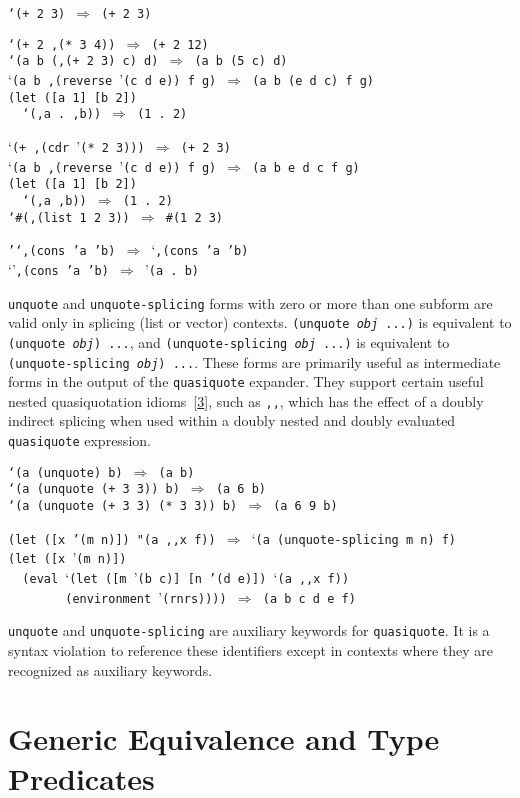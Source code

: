 \begin{alltt}
`(+ 2 3) \(\Rightarrow\) (+ 2 3)

`(+ 2 ,(* 3 4)) \(\Rightarrow\) (+ 2 12)
`(a b (,(+ 2 3) c) d) \(\Rightarrow\) (a b (5 c) d)
`(a b ,(reverse '(c d e)) f g) \(\Rightarrow\) (a b (e d c) f g)
(let ([a 1] [b 2])
  `(,a . ,b)) \(\Rightarrow\) (1 . 2)

`(+ ,\@{}(cdr '(* 2 3))) \(\Rightarrow\) (+ 2 3)
`(a b ,\@{}(reverse '(c d e)) f g) \(\Rightarrow\) (a b e d c f g)
(let ([a 1] [b 2])
  `(,a ,\@{}b)) \(\Rightarrow\) (1 . 2)
`\#{}(,\@{}(list 1 2 3)) \(\Rightarrow\) \#{}(1 2 3)

'`,(cons 'a 'b) \(\Rightarrow\) `,(cons 'a 'b)
`',(cons 'a 'b) \(\Rightarrow\) '(a . b)
\end{alltt}

\texttt{unquote} and \texttt{unquote-splicing} forms with zero or more than
one subform are valid only in splicing (list or
vector) contexts.
\texttt{(unquote \textit{obj} ...)} is equivalent to
\texttt{(unquote \textit{obj}) ...}, and
\texttt{(unquote-splicing \textit{obj} ...)} is equivalent to
\texttt{(unquote-splicing \textit{obj}) ...}.
These forms are primarily useful as intermediate forms in the output
of the \texttt{quasiquote} expander.
They support certain useful nested quasiquotation
idioms [\hyperref[bibliography_g221]{3}], such as \texttt{,\@{},\@{}}, which has the
effect of a doubly indirect splicing when used within a doubly nested
and doubly evaluated \texttt{quasiquote} expression.

\begin{alltt}
`(a (unquote) b) \(\Rightarrow\) (a b)
`(a (unquote (+ 3 3)) b) \(\Rightarrow\) (a 6 b)
`(a (unquote (+ 3 3) (* 3 3)) b) \(\Rightarrow\) (a 6 9 b)

(let ([x '(m n)]) "(a ,\@{},\@{}x f)) \(\Rightarrow\) `(a (unquote-splicing m n) f)
(let ([x '(m n)])
  (eval `(let ([m '(b c)] [n '(d e)]) `(a ,\@{},\@{}x f))
        (environment '(rnrs)))) \(\Rightarrow\) (a b c d e f)
\end{alltt}

\texttt{unquote} and \texttt{unquote-splicing} are auxiliary keywords for
\texttt{quasiquote}.
It is a syntax violation to reference these identifiers except in contexts
where they are recognized as auxiliary keywords.


\section{\label{objects_g108}\label{objects_h2}Generic Equivalence and Type Predicates\label{objects_SECTGENERIC}}



